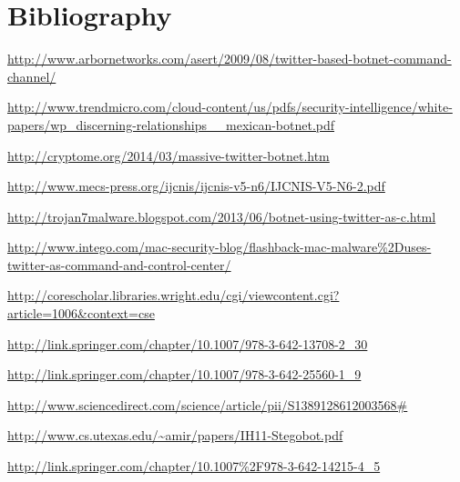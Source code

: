 \documentclass[paper=a4, fontsize=11pt]{scrartcl} %
\numberwithin{equation}{section} %
\numberwithin{figure}{section} %
\numberwithin{table}{section} %
\begin{document}
\clearpage
\section{Bibliography}

\begingroup
\renewcommand{\section}[2]{}%
\begin{thebibliography}{99}

	\url{http://www.arbornetworks.com/asert/2009/08/twitter-based-botnet-command-channel/}

	\url{http://www.trendmicro.com/cloud-content/us/pdfs/security-intelligence/white-papers/wp_discerning-relationships__mexican-botnet.pdf}

	\url{http://cryptome.org/2014/03/massive-twitter-botnet.htm}

	\url{http://www.mecs-press.org/ijcnis/ijcnis-v5-n6/IJCNIS-V5-N6-2.pdf}

	\url{http://trojan7malware.blogspot.com/2013/06/botnet-using-twitter-as-c.html}

	\url{http://www.intego.com/mac-security-blog/flashback-mac-malware\%2Duses-twitter-as-command-and-control-center/}

	\url{http://corescholar.libraries.wright.edu/cgi/viewcontent.cgi?article=1006&context=cse}

	\url{http://link.springer.com/chapter/10.1007/978-3-642-13708-2_30}

	\url{http://link.springer.com/chapter/10.1007/978-3-642-25560-1_9}

	\url{http://www.sciencedirect.com/science/article/pii/S1389128612003568#}

	\url{http://www.cs.utexas.edu/~amir/papers/IH11-Stegobot.pdf}

	\url{http://link.springer.com/chapter/10.1007\%2F978-3-642-14215-4_5}

\end{thebibliography}

\endgroup
\end{document}
